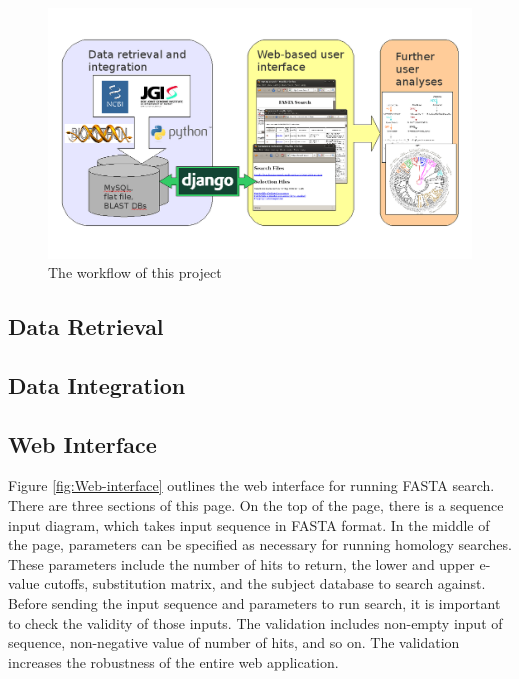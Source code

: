 \documentclass[11pt,letterpaper,twoside,english]{article}
\begin{document}
\begin{figure}[tbph]
\begin{centering}
\includegraphics[width=0.95\linewidth]{figures/workflow.png}
\par\end{centering}

\caption{\label{fig:The-workflow-of}The workflow of this project}

\end{figure}


\subsection{\label{sub:Data-Retrieval}Data Retrieval}




\subsection{Data Integration}




\subsection{Web Interface}







Figure \ref{fig:Web-interface} outlines the web interface for running
FASTA search. There are three sections of this page. On the top of
the page, there is a sequence input diagram, which takes input sequence
in FASTA format. In the middle of the page, parameters can be specified
as necessary for running homology searches. These parameters include
the number of hits to return, the lower and upper e-value cutoffs,
substitution matrix, and the subject database to search against. Before
sending the input sequence and parameters to run search, it is important
to check the validity of those inputs. The validation includes non-empty
input of sequence, non-negative value of number of hits, and so on.
The validation increases the robustness of the entire web application.
\end{document}
